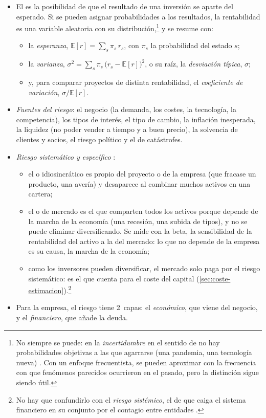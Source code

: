\documentclass[11pt]{article}
\begin{document}
\begin{itemize}
\item El  es la posibilidad de que el resultado de una inversión se aparte del esperado. Si se pueden asignar probabilidades a los resultados, la rentabilidad es una variable aleatoria con su distribución,\footnote{No siempre se puede: en la \emph{incertidumbre} en el sentido de \textcite{Knight1921Risk} no hay probabilidades objetivas a las que agarrarse (una pandemia, una tecnología nueva) . Con un enfoque frecuentista, se pueden aproximar con la frecuencia con que fenómenos parecidos ocurrieron en el pasado, pero la distinción sigue siendo útil.} y se resume con:
  \begin{itemize}
  \item la \emph{esperanza}, $\mathbb{E}[r]=\sum_s \pi_s\,r_s$, con $\pi_s$ la probabilidad del estado $s$;
  \item la \emph{varianza}, $\sigma^2=\sum_s \pi_s\,\big(r_s-\mathbb{E}[r]\big)^2$, o su raíz, la \emph{desviación típica}, $\sigma$;
  \item y, para comparar proyectos de distinta rentabilidad, el \emph{coeficiente de variación}, $\sigma/\mathbb{E}[r]$.
  \end{itemize}
\item \emph{Fuentes del riesgo}: el negocio (la demanda, los costes, la tecnología, la competencia), los tipos de interés, el tipo de cambio, la inflación inesperada, la liquidez (no poder vender a tiempo y a buen precio), la solvencia de clientes y socios, el riesgo político y el de catástrofes.
\item \emph{Riesgo sistemático y específico} :
  \begin{itemize}
  \item el  o idiosincrático es propio del proyecto o de la empresa (que fracase un producto, una avería) y desaparece al combinar muchos activos en una cartera;
  \item el  o de mercado es el que comparten todos los activos porque depende de la marcha de la economía (una recesión, una subida de tipos), y no se puede eliminar diversificando. Se mide con la beta, la sensibilidad de la rentabilidad del activo a la del mercado: lo que no depende de la empresa es su causa, la marcha de la economía;
  \item como los inversores pueden diversificar, el mercado solo paga por el riesgo sistemático: es el que cuenta para el coste del capital (\ref{sec:coste-estimacion}).\footnote{No hay que confundirlo con el \emph{riesgo sistémico}, el de que caiga el sistema financiero en su conjunto por el contagio entre entidades .}
  \end{itemize}
\item Para la empresa, el riesgo tiene 2~capas: el \emph{económico}, que viene del negocio, y el \emph{financiero}, que añade la deuda\nocite{Vernimmen2017Corporate}.
\end{itemize}
\end{document}
